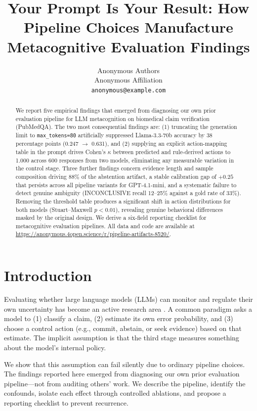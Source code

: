 \documentclass[11pt]{article}
\title{Your Prompt Is Your Result: How Pipeline Choices Manufacture Metacognitive Evaluation Findings}
\author{Anonymous Authors \\
  Anonymous Affiliation \\
  \texttt{anonymous@example.com}}
\date{}
\begin{document}
\maketitle

\begin{abstract}
We report five empirical findings that emerged from diagnosing our own prior evaluation pipeline for LLM metacognition on biomedical claim verification (PubMedQA). The two most consequential findings are: (1) truncating the generation limit to \texttt{max\_tokens=80} artificially suppressed Llama-3.3-70b accuracy by 38 percentage points (0.247 $\rightarrow$ 0.631), and (2) supplying an explicit action-mapping table in the prompt drives Cohen's $\kappa$ between predicted and rule-derived actions to 1.000 across 600 responses from two models, eliminating any measurable variation in the control stage. Three further findings concern evidence length and sample composition driving 88\% of the abstention artifact, a stable calibration gap of $+0.25$ that persists across all pipeline variants for GPT-4.1-mini, and a systematic failure to detect genuine ambiguity (INCONCLUSIVE recall 12--25\% against a gold rate of 33\%). Removing the threshold table produces a significant shift in action distributions for both models (Stuart--Maxwell $p < 0.01$), revealing genuine behavioral differences masked by the original design. We derive a six-field reporting checklist for metacognitive evaluation pipelines. All data and code are available at \url{https://anonymous.4open.science/r/pipeline-artifacts-8520/}.
\end{abstract}

\section{Introduction}

Evaluating whether large language models (LLMs) can monitor and regulate their own uncertainty has become an active research area \cite{kadavath2022language, xiong2024can, tian2023just}. A common paradigm asks a model to (1) classify a claim, (2) estimate its own error probability, and (3) choose a control action (e.g., commit, abstain, or seek evidence) based on that estimate. The implicit assumption is that the third stage measures something about the model's internal policy.

We show that this assumption can fail silently due to ordinary pipeline choices. The findings reported here emerged from diagnosing our own prior evaluation pipeline---not from auditing others' work. We describe the pipeline, identify the confounds, isolate each effect through controlled ablations, and propose a reporting checklist to prevent recurrence.
\end{document}
